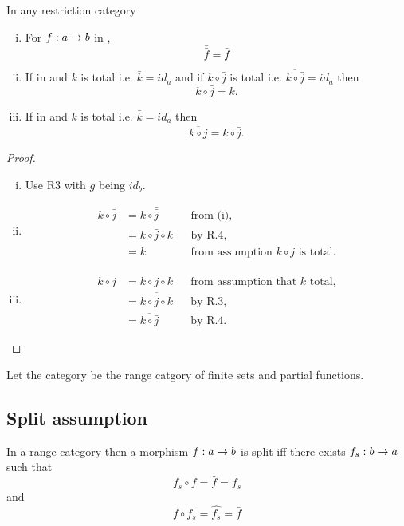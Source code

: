 \documentclass[10pt,a4paper]{article}
\theoremstyle{remark}
\begin{document}
\begin{lemma}
\label{restrictioncatlemma}
In any restriction category \catc
\begin{enumerate} [(i)]
\item For $f:a \rightarrow b$ in \catcw,
$$\bar{\bar{f}}=\bar{f}$$
\item If  in \catcw 
and $k$ is total i.e. $\bar{k}=id_a$
and if $k \circ \bar{j}$ is total i.e. $\overline{k \circ \bar{j}}=id_a$
then
$$k \circ \bar{j} = k.$$
\item If  in \catcw 
and $k$ is total i.e. $\bar{k}=id_a$ then
$$\overline{k \circ j} = \overline{k \circ \bar{j}}.$$
\end{enumerate}
\end{lemma}
\begin{proof}
\begin{enumerate} [(i)]
\item Use R3 with $g$ being $id_b$.
\item 
\begin{align*}
k \circ \bar{j} &= k \circ \bar{\bar{j}}              && \mbox{from (i),}\\
                &= \overline{k \circ \bar{j}} \circ k && \mbox{by R.4,}   \\
                &= k                                  && \mbox{from assumption $k \circ \bar{j}$ is total.}
\end{align*}
\item 
\begin{align*}
\overline{k \circ j} &= \overline{k \circ j} \circ \bar{k}    && \mbox{from assumption that $k$ total,}\\
                     &= \overline{\overline{k \circ j} \circ k} && \mbox{by R.3,} \\
                     &= \overline{k \circ \bar{j}}              && \mbox{by R.4.}
\end{align*}
\end{enumerate}
\end{proof}

Let the category \FinPar be the range catgory of finite sets and partial functions.

\subsection{Split assumption}
\begin{definition}
In a range category \catcw then a morphism $f:a \rightarrow b$ is split iff
there exists $f_s:b \rightarrow a$ 
such that
\begin{equation*} 
f_s \circ f = \hat{f} = \bar{f_s}
\end{equation*}
and
\begin{equation*} 
f \circ f_s = \hat{f_s} = \bar{f}
\end{equation*}
\end{definition}
\end{document}
